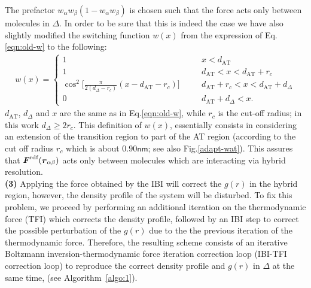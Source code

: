 \documentclass[aps,pre,preprint]{revtex4}
\renewcommand{\v}[1]{\textbf{\textit{#1}}}
\begin{document}
The prefactor $ w_\alpha w_\beta (1-w_\alpha w_\beta)$ is chosen such that the force acts only between molecules in $\Delta$. In order to be sure that this is indeed the case we have also slightly modified the switching function $w(x)$ from the expression of Eq.\ref{eqn:old-w} to the following:
\begin{align}\label{eqn:new-w}
  w(x) =
  \left\{
    \begin{array}{lcl}
      1 &\quad& x < d_{\textrm{AT}}\\
      1  && d_{\textrm{AT}} < x < d_{\textrm{AT}} + r_c\\
      \cos^2\big[\frac{\pi}{2(d_{{\Delta}} - r_c)} (x - d_{\textrm{AT}} - r_c)\big] && d_{\textrm{AT}} + r_c < x < d_{\textrm{AT}} + d_{{\Delta}} \\
      0 && d_{\textrm{AT}} + d_{{\Delta}}  < x.
    \end{array}
  \right.
\end{align}
$d_{\textrm{AT}}$, $d_{{\Delta}}$ and $x$ are the same as in Eq.\ref{eqn:old-w}, while $r_c$ is the cut-off
radius; in this work $d_{{\Delta}} \geq 2r_c$.  This definition of $w(x)$, essentially consists in considering an extension of the transition region to part of the AT region (according to the cut off radius $r_c$ which is about $0.90\textsf{nm}$; see also Fig.\ref{adapt-wat}). This assures that $\v F^{\textrm{rdf}}(\v r_{\alpha\beta})$ acts only between molecules which are interacting via hybrid resolution.\\
{\bf (3)}  Applying the force obtained by the IBI will correct the $g(r)$ in the hybrid region, however,
the density profile of the system will be disturbed.
To fix this problem, we proceed by performing an additional iteration on the thermodynamic force (TFI) which corrects the density profile,
followed by an IBI step to correct the possible perturbation
of the $g(r)$ due to the the previous iteration of the thermodynamic force.
Therefore, the resulting scheme consists of an iterative
Boltzmann inversion-thermodynamic force iteration correction loop
(IBI-TFI correction loop) to reproduce the correct density
profile and $g(r)$ in $\Delta$ at the same time, (see Algorithm~\ref{algo:1}). 
\end{document}
